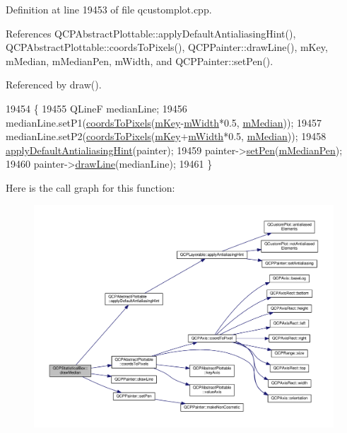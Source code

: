 Definition at line 19453 of file qcustomplot.\+cpp.



References Q\+C\+P\+Abstract\+Plottable\+::apply\+Default\+Antialiasing\+Hint(), Q\+C\+P\+Abstract\+Plottable\+::coords\+To\+Pixels(), Q\+C\+P\+Painter\+::draw\+Line(), m\+Key, m\+Median, m\+Median\+Pen, m\+Width, and Q\+C\+P\+Painter\+::set\+Pen().



Referenced by draw().


\begin{DoxyCode}
19454 \{
19455   QLineF medianLine;
19456   medianLine.setP1(\hyperlink{class_q_c_p_abstract_plottable_ade710a776104b14c1c835168ce1bfc5c}{coordsToPixels}(\hyperlink{class_q_c_p_statistical_box_a86fd1d3be5c5bc11d11eda7517069af4}{mKey}-\hyperlink{class_q_c_p_statistical_box_af365e40b0f706c3d76f857c7957f629d}{mWidth}*0.5, 
      \hyperlink{class_q_c_p_statistical_box_ae43287ca13c8166bde2ac19bf0969d23}{mMedian}));
19457   medianLine.setP2(\hyperlink{class_q_c_p_abstract_plottable_ade710a776104b14c1c835168ce1bfc5c}{coordsToPixels}(\hyperlink{class_q_c_p_statistical_box_a86fd1d3be5c5bc11d11eda7517069af4}{mKey}+\hyperlink{class_q_c_p_statistical_box_af365e40b0f706c3d76f857c7957f629d}{mWidth}*0.5, 
      \hyperlink{class_q_c_p_statistical_box_ae43287ca13c8166bde2ac19bf0969d23}{mMedian}));
19458   \hyperlink{class_q_c_p_abstract_plottable_a76e9d6cc7972dc1528f526d163766aca}{applyDefaultAntialiasingHint}(painter);
19459   painter->\hyperlink{class_q_c_p_painter_af9c7a4cd1791403901f8c5b82a150195}{setPen}(\hyperlink{class_q_c_p_statistical_box_a1af5b601049c575f778ae270f40c9443}{mMedianPen});
19460   painter->\hyperlink{class_q_c_p_painter_a0b4b1b9bd495e182c731774dc800e6e0}{drawLine}(medianLine);
19461 \}
\end{DoxyCode}


Here is the call graph for this function\+:\nopagebreak
\begin{figure}[H]
\begin{center}
\leavevmode
\includegraphics[width=350pt]{class_q_c_p_statistical_box_a16fef8bc19e5a09d82033edcfe919495_cgraph}
\end{center}
\end{figure}




